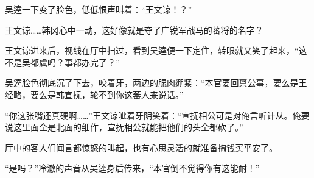 吴逵一下变了脸色，低低恨声叫着：“王文谅！？”

王文谅……韩冈心中一动，这好像就是夺了广锐军战马的蕃将的名字？

王文谅进来后，视线在厅中扫过，看到吴逵便一下定住，转眼就又笑了起来，“这不是吴都虞吗？事都办完了？”

吴逵脸色彻底沉了下去，咬着牙，两边的腮肉绷紧：“本官要回禀公事，要么是王经略，要么是韩宣抚，轮不到你这蕃人来说话。”

“你这张嘴还真硬啊……”王文谅呲着牙阴笑着：“宣抚相公可是对俺言听计从。俺要说这里面全是北面的细作，宣抚相公就能把他们的头全都砍了。”

厅中的客人们闻言都惊怒的叫起，也有心思灵活的就准备掏钱买平安了。

“是吗？”冷澈的声音从吴逵身后传来，“本官倒不觉得你有这能耐！”

